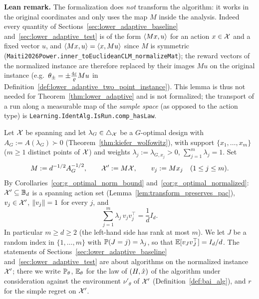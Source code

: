 \textbf{Lean remark.} The formalization does \emph{not} transform the algorithm: it works in
the original coordinates and only uses the map $M$ inside the analysis. Indeed every quantity of
Sections~\ref{sec:lower_adaptive_baseline} and~\ref{sec:lower_adaptive_test} is of the form
$\langle Mx, u \rangle$ for an action $x \in \mathcal{X}$ and a fixed vector $u$, and $\langle Mx, u \rangle = \langle x, Mu \rangle$
since $M$ is symmetric (\texttt{Maiti2026Power.inner\_toEuclideanCLM\_normalizeMat}); the reward vectors
of the normalized instance are therefore replaced by their images $Mu$ on the original instance
(e.g.\ $\theta_\pm = \pm\frac{4\varepsilon}{\varrho}Mu$ in
Definition~\ref{def:lower_adaptive_two_point_instance}). This lemma is thus not needed for
Theorem~\ref{thm:lower_adaptive} and is not formalized; the transport of a run along a
measurable map of the \emph{sample space} (as opposed to the action type) is
\texttt{Learning.IdentAlg.IsRun.comp\_hasLaw}.

\begin{definition}\label{def:normalized_instance}
\leanok
{}
Let $\mathcal{X}$ be spanning and let $\lambda_G \in \triangle_{\mathcal{X}}$ be a $G$-optimal design with
$A_G := A(\lambda_G) \succ 0$ (Theorem~\ref{thm:kiefer_wolfowitz}), with support $\{x_1, \dots, x_m\}$ ($m \ge 1$ distinct
points of $\mathcal{X}$) and weights $\lambda_j := \lambda_{G,x_j} > 0$, $\sum_{j=1}^m \lambda_j = 1$.
Set
\[
  M := d^{-1/2} A_G^{-1/2}, \qquad \mathcal{X}' := M\mathcal{X}, \qquad v_j := M x_j \quad (1 \le j \le m).
\]
By Corollaries~\ref{cor:g_optimal_norm_bound} and~\ref{cor:g_optimal_normalized}:
$\mathcal{X}' \subseteq \mathbb{B}_d$ is a spanning action set (Lemma~\ref{lem:transform_preserves_pac}),
$v_j \in \mathcal{X}'$, $\lVert v_j \rVert = 1$ for every $j$, and
\[
  \sum_{j=1}^m \lambda_j\, v_j v_j^\top = \frac{1}{d} I_d .
\]
In particular $m \ge d \ge 2$ (the left-hand side has rank at most $m$). We let $J$ be a random
index in $\{1,\dots,m\}$ with $\mathbb{P}(J = j) = \lambda_j$, so that
$\mathbb{E}[v_J v_J^\top] = I_d/d$. The statements of Sections~\ref{sec:lower_adaptive_baseline}
and~\ref{sec:lower_adaptive_test} are about algorithms on the normalized instance $\mathcal{X}'$; there
we write $\mathbb{P}_\theta$, $\mathbb{E}_\theta$ for the law of $(H, \hat{x})$ of the algorithm under
consideration against the environment $\nu'_\theta$ of $\mathcal{X}'$ (Definition~\ref{def:bai_alg}),
and $r$ for the simple regret on $\mathcal{X}'$.
\end{definition}

